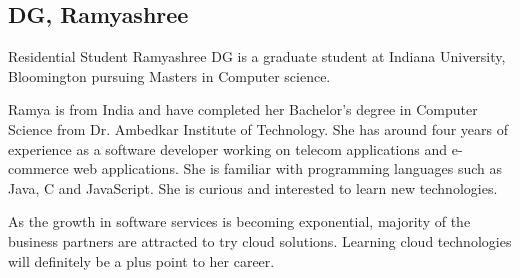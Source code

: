 \subsection{DG, Ramyashree}
Residential Student
Ramyashree DG is a graduate student at Indiana University, Bloomington pursuing
Masters in Computer science.

Ramya is from India and have completed her Bachelor's degree in Computer Science
from Dr. Ambedkar Institute of Technology. She has around four years of
experience as a software developer working on telecom applications and
e-commerce web applications. She is familiar with programming languages such as
Java, C and JavaScript. She is curious and interested to learn new technologies.

As the growth in software services is becoming exponential, majority of the
business partners are attracted to try cloud solutions. Learning cloud
technologies will definitely be a plus point to her career.
